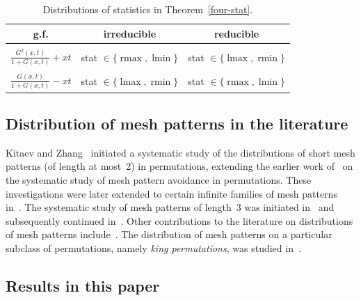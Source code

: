 \documentclass[10pt,a4paper]{article}
\DeclareMathOperator{\rmax}{rmax}
\DeclareMathOperator{\lmax}{lmax}
\DeclareMathOperator{\rmin}{rmin}
\DeclareMathOperator{\lmin}{lmin}
\begin{document}
\begin{table}[htbp]
	\centering
	\begin{tabular}{c|c|c}
		g.f. & irreducible & reducible \\
		\hline
		& & \\[-2mm]
		$\frac{G^2(x,t)}{1+G(x,t)} + xt$
		& stat $\in \{\rmax, \lmin\}$
		& stat $\in \{\lmax, \rmin\}$ \\[2mm]
		\hline
		& & \\[-2mm]
		$\frac{G(x,t)}{1+G(x,t)} - xt$
		& stat $\in \{\lmax, \rmin\}$
		& stat $\in \{\rmax, \lmin\}$
	\end{tabular} 
	\caption{Distributions of statistics in Theorem~\ref{four-stat}.}
	\label{tab-dist-rmax-thm}
\end{table}

\subsection{Distribution of mesh patterns in the literature}

Kitaev and Zhang~\cite{KZ} initiated a systematic study of the distributions of short mesh patterns (of length at most~2) in permutations, extending the earlier work of~\cite{Hilmarsson2015Wilf} on the systematic study of mesh pattern avoidance in permutations. These investigations were later extended to certain infinite families of mesh patterns in~\cite{KZZ}. The systematic study of mesh patterns of length~3 was initiated in~\cite{KLv} and subsequently continued in~\cite{LvZhang,LvZhang1}. Other contributions to the literature on distributions of mesh patterns include~\cite{FFKL,HanZeng,HanZeng1}. The distribution of mesh patterns on a particular subclass of permutations, namely \emph{king permutations}, was studied in~\cite{LiZhang}.

\subsection{Results in this paper}
\end{document}
